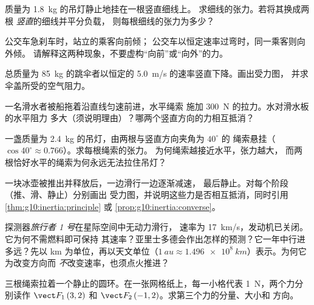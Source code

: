 \begin{exercise}[$\star\star$]\label{exo:g10:inertia:8}
质量为 \qty{1.8}{kg} 的吊灯静止地挂在一根竖直细线上。
求细线的张力。若将其换成两根
\emph{竖直}的细线并平分负载，
则每根细线的张力为多少？
\end{exercise}

\begin{exercise}[$\star\star$]\label{exo:g10:inertia:9}
公交车急刹车时，站立的乘客向前倾；
公交车以恒定速率过弯时，同一乘客则向外倾。
请解释这两种现象，不要虚构“向前”或“向外”的力。
\end{exercise}

\begin{exercise}[$\star\star$]\label{exo:g10:inertia:10}
总质量为 \qty{85}{kg} 的跳伞者以恒定的
\qty{5.0}{m/s} 的速率竖直下降。画出受力图，
并求伞盖所受的空气阻力。
\end{exercise}

\begin{exercise}[$\star\star$]\label{exo:g10:inertia:11}
一名滑水者被船拖着沿直线匀速前进，水平绳索
施加 \qty{300}{N} 的拉力。水对滑水板的水平阻力
多大（须说明理由）？哪两个竖直方向的力相互抵消？
\end{exercise}

\begin{exercise}[$\star\star\star$]\label{exo:g10:inertia:12}
一盏质量为 \qty{2.4}{kg} 的吊灯，由两根与竖直方向夹角为 $40^\circ$ 的
绳索悬挂（$\cos 40^\circ \approx 0.766$）。求每根绳索的张力。
为何绳索越接近水平，张力越大，
而两根恰好水平的绳索为何永远无法拉住吊灯？
\end{exercise}

\begin{exercise}[$\star\star\star$]\label{exo:g10:inertia:13}
一块冰壶被推出并释放后，一边滑行一边逐渐减速，
最后静止。对每个阶段（推、滑、静止）分别画出
受力图，并说明这些力是否相互抵消，同时引用
\cref{thm:g10:inertia:principle} 或 \cref{prop:g10:inertia:converse}。
\end{exercise}

\begin{exercise}[$\star\star\star$]\label{exo:g10:inertia:14}
探测器\emph{旅行者 1 号}在星际空间中无动力滑行，
速率为 \qty{17}{km/s}，发动机已关闭。它为何不需燃料即可保持
其速率？亚里士多德会作出怎样的预测？它一年中行进
多远？先以 \unit{km} 为单位，再以天文单位（$\qty{1}{au} \approx
\qty{1.496e8}{km}$）表示。为何它为改变方向而
\emph{不}改变速率，也须点火推进？
\end{exercise}

\begin{exercise}[$\star\star\star$]\label{exo:g10:inertia:15}
三根绳索拉着一个静止的圆环。在一张网格纸上，每一小格代表
\qty{1}{N}，两个力分别读作 $\vect F_1\,(3, 2)$ 和
$\vect F_2\,(-1, 2)$。求第三个力的分量、大小和
方向。
\end{exercise}

